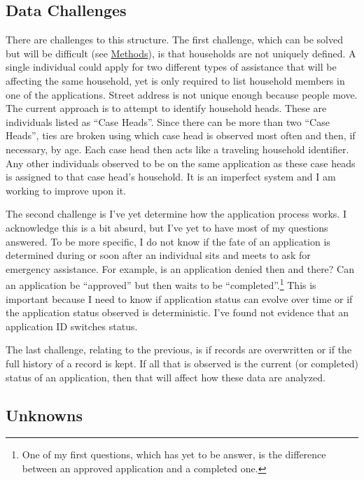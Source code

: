 \documentclass[12pt,letterpaperpaper,]{book}
\begin{document}
\subsection*{Data Challenges}\label{data-challenges}

There are challenges to this structure. The first challenge, which can
be solved but will be difficult (see
\protect\hyperlink{methods-2}{Methods}), is that households are not
uniquely defined. A single individual could apply for two different
types of assistance that will be affecting the same household, yet is
only required to list household members in one of the applications.
Street address is not unique enough because people move. The current
approach is to attempt to identify household heads. These are
individuals listed as ``Case Heads''. Since there can be more than two
``Case Heads'', ties are broken using which case head is observed most
often and then, if necessary, by age. Each case head then acts like a
traveling household identifier. Any other individuals observed to be on
the same application as these case heads is assigned to that case head's
household. It is an imperfect system and I am working to improve upon
it.

The second challenge is I've yet determine how the application process
works. I acknowledge this is a bit absurd, but I've yet to have most of
my questions answered. To be more specific, I do not know if the fate of
an application is determined during or soon after an individual sits and
meets to ask for emergency assistance. For example, is an application
denied then and there? Can an application be ``approved'' but then waits
to be ``completed''.\footnote{One of my first questions, which has yet
  to be answer, is the difference between an approved application and a
  completed one.} This is important because I need to know if
application status can evolve over time or if the application status
observed is deterministic. I've found not evidence that an application
ID switches status.

The last challenge, relating to the previous, is if records are
overwritten or if the full history of a record is kept. If all that is
observed is the current (or completed) status of an application, then
that will affect how these data are analyzed.

\subsection*{Unknowns}\label{unknowns}
\end{document}
